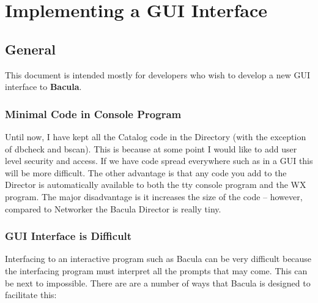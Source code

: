 
\chapter*{Implementing a GUI Interface}
\label{_ChapterStart}

\section{General}

This document is intended mostly for developers who wish to develop a new GUI
interface to {\bf Bacula}.

\subsection{Minimal Code in Console Program}

Until now, I have kept all the Catalog code in the Directory (with the
exception of dbcheck and bscan). This is because at some point I would like to
add user level security and access. If we have code spread everywhere such as
in a GUI this will be more difficult. The other advantage is that any code you
add to the Director is automatically available to both the tty console program
and the WX program. The major disadvantage is it increases the size of the
code -- however, compared to Networker the Bacula Director is really tiny.

\subsection{GUI Interface is Difficult}

Interfacing to an interactive program such as Bacula can be very difficult
because the interfacing program must interpret all the prompts that may come.
This can be next to impossible. There are are a number of ways that Bacula is
designed to facilitate this:

